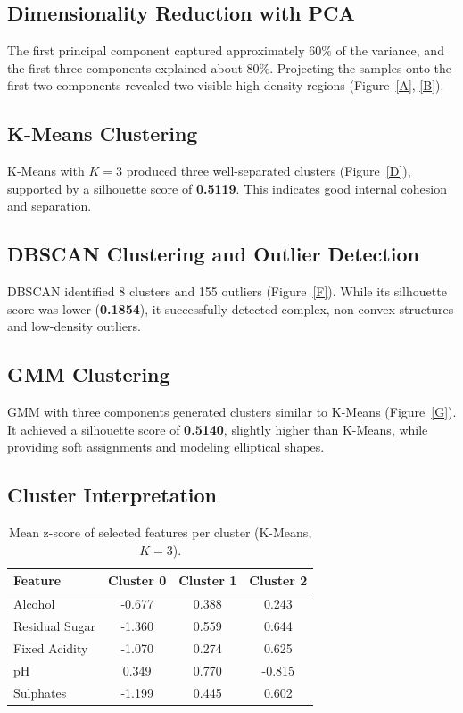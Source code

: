 \documentclass[12pt]{article}
\begin{document}
\subsection*{Dimensionality Reduction with PCA}
The first principal component captured approximately 60\% of the variance, and the first three components explained about 80\%. Projecting the samples onto the first two components revealed two visible high-density regions (Figure~\ref{A}, \ref{B}).

\subsection*{K-Means Clustering}
K-Means with $K=3$ produced three well-separated clusters (Figure~\ref{D}), supported by a silhouette score of \textbf{0.5119}. This indicates good internal cohesion and separation.

\subsection*{DBSCAN Clustering and Outlier Detection}
DBSCAN identified 8 clusters and 155 outliers (Figure~\ref{F}). While its silhouette score was lower (\textbf{0.1854}), it successfully detected complex, non-convex structures and low-density outliers.

\subsection*{GMM Clustering}
GMM with three components generated clusters similar to K-Means (Figure~\ref{G}). It achieved a silhouette score of \textbf{0.5140}, slightly higher than K-Means, while providing soft assignments and modeling elliptical shapes.

\subsection*{Cluster Interpretation}
\begin{table}[H]
\centering
\begin{tabular}{lccc}
\toprule
\textbf{Feature} & \textbf{Cluster 0} & \textbf{Cluster 1} & \textbf{Cluster 2} \\
\midrule
Alcohol          & -0.677             & 0.388              & 0.243              \\
Residual Sugar   & -1.360             & 0.559              & 0.644              \\
Fixed Acidity    & -1.070             & 0.274              & 0.625              \\
pH               & 0.349              & 0.770              & -0.815             \\
Sulphates        & -1.199             & 0.445              & 0.602              \\
\bottomrule
\end{tabular}
\caption{Mean z-score of selected features per cluster (K-Means, $K=3$).}
\label{Z}
\end{table}
\end{document}
